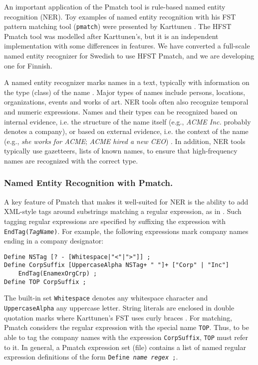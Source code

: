\documentclass{llncs}
\begin{document}
An important application of the Pmatch tool is rule-based named entity
recognition (NER). Toy examples of named entity recognition with
his FST pattern matching tool (\texttt{pmatch}) were presented by Karttunen
\cite{karttunen/2011}. The HFST Pmatch tool was modelled after
Karttunen's, but it is an independent implementation with
some differences in features. We have
converted a full-scale named entity recognizer for Swedish to use
HFST Pmatch, and we are developing one for Finnish.

A named entity recognizer marks names in a text, typically with
information on the type (class) of the name \cite{nadeau/2007}. Major
types of names include persons, locations, organizations, events and
works of art. NER tools often also recognize temporal and numeric
expressions. Names and their types can be recognized based on internal
evidence, i.e. the structure of the name itself (e.g., \textit{ACME
  Inc.} probably denotes a company), or based on external evidence,
i.e. the context of the name (e.g., \textit{she works for ACME};
\textit{ACME hired a new CEO}) \cite{mcdonald/1996}. In
addition, NER tools typically use gazetteers, lists of known names, to
ensure that high-frequency names are recognized with the correct type.

\subsubsection{Named Entity Recognition with Pmatch.}
\label{pmatch_for_ner}

A key feature of Pmatch that makes it well-suited for NER is the ability
to add XML-style tags around substrings matching a regular expression,
as in \cite{karttunen/2011}. Such tagging regular expressions are
specified by suffixing the expression with
\texttt{EndTag(\textit{TagName})}. For example, the following
expressions mark company names ending in a company designator:

\begin{verbatim}
Define NSTag [? - [Whitespace|"<"|">"]] ;
Define CorpSuffix [UppercaseAlpha NSTag+ " "]+ ["Corp" | "Inc"]
    EndTag(EnamexOrgCrp) ;
Define TOP CorpSuffix ;
\end{verbatim}

\begin{sloppypar}
\noindent
The built-in set \texttt{Whitespace} denotes any whitespace character
and \texttt{UppercaseAlpha} any uppercase letter. String literals are
enclosed in double quotation marks where Karttunen's FST uses curly braces
\cite{karttunen/2011}.
For matching, Pmatch considers the regular expression with the special
name \texttt{TOP}. Thus, to be able to tag the company names with the
expression \texttt{CorpSuffix}, \texttt{TOP} must refer to it.
In general, a Pmatch expression set (file) contains a list of named
regular expression definitions of the form \texttt{Define
  \textit{name} \textit{regex} ;}.
\end{sloppypar}
\end{document}

